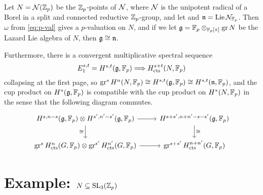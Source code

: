 \begin{theorem}
  Let $N = \mathcal{N}(\mathbb{Z}_{p})$ be the $\mathbb{Z}_{p}$-points of $\mathcal{N}$, where $\mathcal{N}$ is the unipotent radical of a Borel in a split and connected reductive $\mathbb{Z}_{p}$-group, and let and $\mathfrak{n} = \operatorname{Lie}{\mathcal{N}_{\mathbb{F}_{p}}}$. Then $\omega$ from \eqref{eq:p-val} gives a $p$-valuation on $N$, and if we let $\mathfrak{g} = \mathbb{F}_{p} \otimes_{\mathbb{F}_{p}[\pi]} \operatorname{gr} N$ be the Lazard Lie algebra of $N$, then $\mathfrak{g} \cong \mathfrak{n}$.

  Furthermore, there is a convergent multiplicative spectral sequence
  \[
    E_1^{s,t} = H^{s,t}(\mathfrak{g},\mathbb{F}_{p}) \Longrightarrow H_{\mathrm{cts}}^{s+t}(N,\mathbb{F}_{p})
  \]
  collapsing at the first page, so $\operatorname{gr}^{s} H^{n}(N,\mathbb{F}_{p}) \cong H^{s,t}(\mathfrak{g},\mathbb{F}_{p}) \cong H^{s,t}(\mathfrak{n},\mathbb{F}_{p})$, and the cup product on $H^{*}(\mathfrak{g},\mathbb{F}_{p})$ is compatible with the cup product on $H^{*}(N,\mathbb{F}_{p})$ in the sense that the following diagram commutes.
  \[
    \begin{tikzcd}
      H^{s,n-s}(\lie{g}, \F_{p}) \otimes H^{s',n'-s'}(\lie{g},\F_{p}) \ar[r] \ar[d,swap,"\iso"] & H^{s+s',n+n'-s-s'}(\lie{g},\F_{p}) \ar[d,"\iso"] \\
      \gr^s \Hc^n(G,\F_{p}) \otimes \gr^{s'} \Hc^{n'}(G,\F_{p}) \ar[r] & \gr^{s+s'}\Hc^{n+n'}(G,\F_{p})
    \end{tikzcd}
  \]
\end{theorem}


\section{Example: \texorpdfstring{$N \subseteq \operatorname{SL}_{3}(\mathbb{Z}_{p})$}{N in SL3(Zp)}}%
\label{sec:ex-N-in-SL3}

